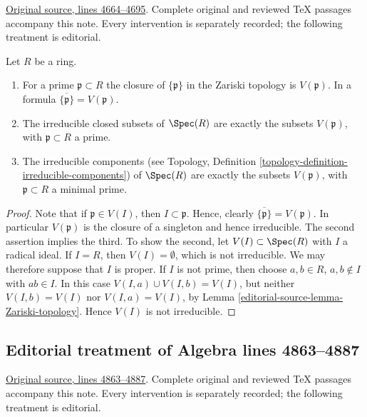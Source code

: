 \hypertarget{algebra-context-024}{}

\noindent\href{https://github.com/stacks/stacks-project/blob/a04446e57ec1fbc252a871afcec7752fb2807b14/algebra.tex\#L4664}{Original source, lines 4664--4695}. Complete original and reviewed TeX passages accompany this note. Every intervention is separately recorded; the following treatment is editorial.


\begin{lemma}
\label{editorial-source-lemma-irreducible}
Let $R$ be a ring.
\begin{enumerate}
\item For a prime $\mathfrak p \subset R$ the closure
of $\{\mathfrak p\}$ in the Zariski topology is $V(\mathfrak p)$.
In a formula $\overline{\{\mathfrak p\}} = V(\mathfrak p)$.
\item The irreducible closed subsets of $\Spec(R)$ are
exactly the subsets $V(\mathfrak p)$, with $\mathfrak p \subset R$
a prime.
\item The irreducible components (see Topology,
Definition \ref{topology-definition-irreducible-components})
of $\Spec(R)$ are  exactly the subsets $V(\mathfrak p)$,
with $\mathfrak p \subset R$ a minimal prime.
\end{enumerate}
\end{lemma}

\begin{proof}
Note that if $ \mathfrak p \in V(I)$, then
$I \subset \mathfrak p$. Hence,
clearly $\overline{\{\mathfrak p\}} = V(\mathfrak p)$.
In particular $V(\mathfrak p)$ is the closure of
a singleton and hence irreducible.
The second assertion implies the third.
To show the second, let
$V(I) \subset \Spec(R)$ with $I$ a radical ideal.
If $I=R$, then $V(I)=\emptyset$, which is not irreducible.
We may therefore suppose that $I$ is proper.
If $I$ is not prime, then choose $a, b\in R$, $a, b\not \in I$
with $ab\in I$. In this case $V(I, a) \cup V(I, b) = V(I)$,
but neither $V(I, b) = V(I)$ nor $V(I, a) = V(I)$, by
Lemma \ref{editorial-source-lemma-Zariski-topology}. Hence $V(I)$ is not
irreducible.
\end{proof}


\subsection{Editorial treatment of Algebra lines 4863--4887}

\hypertarget{algebra-context-025}{}

\noindent\href{https://github.com/stacks/stacks-project/blob/a04446e57ec1fbc252a871afcec7752fb2807b14/algebra.tex\#L4863}{Original source, lines 4863--4887}. Complete original and reviewed TeX passages accompany this note. Every intervention is separately recorded; the following treatment is editorial.


